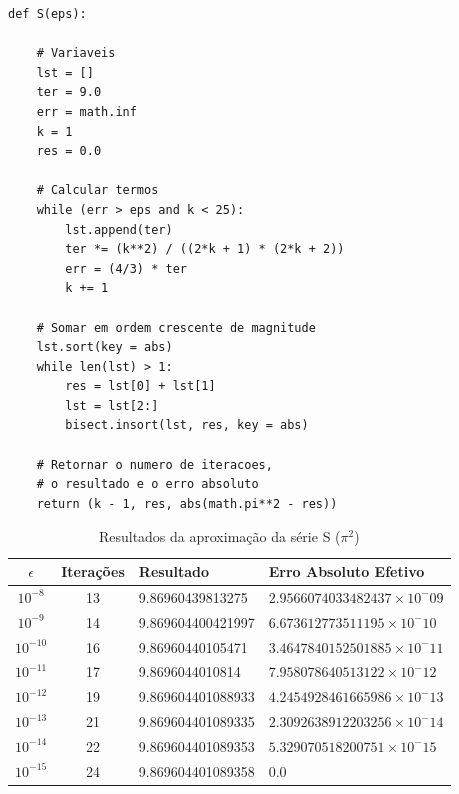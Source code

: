 \documentclass{article}
\begin{document}
\begin{center}
\begin{minipage}{0.8\linewidth}
\begin{lstlisting}[style=pythoncode]
def S(eps):

    # Variaveis
    lst = []
    ter = 9.0
    err = math.inf
    k = 1
    res = 0.0

    # Calcular termos
    while (err > eps and k < 25):
        lst.append(ter)
        ter *= (k**2) / ((2*k + 1) * (2*k + 2))
        err = (4/3) * ter
        k += 1

    # Somar em ordem crescente de magnitude
    lst.sort(key = abs)
    while len(lst) > 1:
        res = lst[0] + lst[1]
        lst = lst[2:]
        bisect.insort(lst, res, key = abs)

    # Retornar o numero de iteracoes,
    # o resultado e o erro absoluto
    return (k - 1, res, abs(math.pi**2 - res))
\end{lstlisting}
\end{minipage}
\end{center}

\begin{table}[H]
    \centering
    \begin{tabular}{|c|c|l|l|}
        \hline
        \textbf{$\epsilon$} & \textbf{Iterações} & \textbf{Resultado} & \textbf{Erro Absoluto Efetivo} \\ \hline
        $10^{-8}$  & 13 & 9.86960439813275  & $2.9566074033482437 \times 10^-09$ \\ \hline
        $10^{-9}$  & 14 & 9.869604400421997 & $6.673612773511195 \times 10^-10$  \\ \hline
        $10^{-10}$ & 16 & 9.86960440105471  & $3.4647840152501885 \times 10^-11$ \\ \hline
        $10^{-11}$ & 17 & 9.8696044010814   & $7.958078640513122 \times 10^-12$  \\ \hline
        $10^{-12}$ & 19 & 9.869604401088933 & $4.2454928461665986 \times 10^-13$ \\ \hline
        $10^{-13}$ & 21 & 9.869604401089335 & $2.3092638912203256 \times 10^-14$ \\ \hline
        $10^{-14}$ & 22 & 9.869604401089353 & $5.329070518200751 \times 10^-15$  \\ \hline
        $10^{-15}$ & 24 & 9.869604401089358 & $0.0$                              \\ \hline
    \end{tabular}
    \vspace{0.2cm}
    \caption{Resultados da aproximação da série S ($\pi^2$)}
\end{table}
\end{document}
